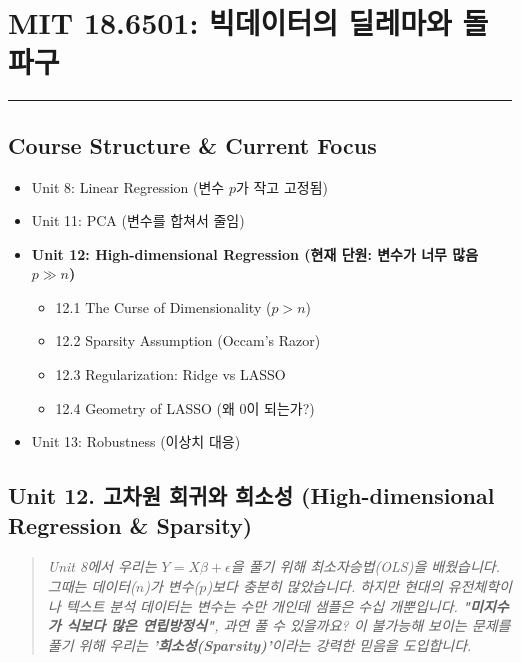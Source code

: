 \documentclass[11pt,a4paper]{book}
\theoremstyle{definition}
\begin{document}
\chapter{MIT 18.6501: 빅데이터의 딜레마와 돌파구}
\label{ch:lecture12}


\vspace{1cm}
\hrule
\vspace{1cm}

\section*{Course Structure \& Current Focus}
\begin{itemize}
    \item Unit 8: Linear Regression (변수 $p$가 작고 고정됨)
    \item Unit 11: PCA (변수를 합쳐서 줄임)
    \item \textbf{\textcolor{mainblue}{Unit 12: High-dimensional Regression (현재 단원: 변수가 너무 많음 $p \gg n$)}}
    \begin{itemize}
        \item 12.1 The Curse of Dimensionality ($p > n$)
        \item 12.2 Sparsity Assumption (Occam's Razor)
        \item 12.3 Regularization: Ridge vs LASSO
        \item 12.4 Geometry of LASSO (왜 0이 되는가?)
    \end{itemize}
    \item Unit 13: Robustness (이상치 대응)
\end{itemize}


\section{Unit 12. 고차원 회귀와 희소성 (High-dimensional Regression \& Sparsity)}

\begin{quote}
\textit{Unit 8에서 우리는 $Y = X\beta + \epsilon$을 풀기 위해 최소자승법(OLS)을 배웠습니다. 그때는 데이터($n$)가 변수($p$)보다 충분히 많았습니다. 하지만 현대의 유전체학이나 텍스트 분석 데이터는 변수는 수만 개인데 샘플은 수십 개뿐입니다. \textbf{"미지수가 식보다 많은 연립방정식"}, 과연 풀 수 있을까요? 이 불가능해 보이는 문제를 풀기 위해 우리는 \textbf{'희소성(Sparsity)'}이라는 강력한 믿음을 도입합니다.}
\end{quote}
\end{document}
